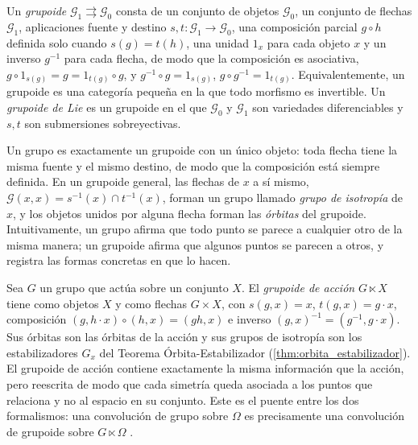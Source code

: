 \begin{definition}[Grupoide]\label{def:grupoide}
Un \textit{grupoide} $\mathcal{G}_1 \rightrightarrows \mathcal{G}_0$ consta de un conjunto de objetos $\mathcal{G}_0$, un conjunto de flechas $\mathcal{G}_1$, aplicaciones fuente y destino $s, t: \mathcal{G}_1 \to \mathcal{G}_0$, una composición parcial $g \circ h$ definida solo cuando $s(g) = t(h)$, una unidad $1_x$ para cada objeto $x$ y un inverso $g^{-1}$ para cada flecha, de modo que la composición es asociativa, $g \circ 1_{s(g)} = g = 1_{t(g)} \circ g$, y $g^{-1} \circ g = 1_{s(g)}$, $g \circ g^{-1} = 1_{t(g)}$. Equivalentemente, un grupoide es una categoría pequeña en la que todo morfismo es invertible. Un \textit{grupoide de Lie} es un grupoide en el que $\mathcal{G}_0$ y $\mathcal{G}_1$ son variedades diferenciables y $s, t$ son submersiones sobreyectivas.
\end{definition}

Un grupo es exactamente un grupoide con un único objeto: toda flecha tiene la misma fuente y el mismo destino, de modo que la composición está siempre definida. En un grupoide general, las flechas de $x$ a sí mismo, $\mathcal{G}(x,x) = s^{-1}(x) \cap t^{-1}(x)$, forman un grupo llamado \textit{grupo de isotropía} de $x$, y los objetos unidos por alguna flecha forman las \textit{órbitas} del grupoide. Intuitivamente, un grupo afirma que todo punto se parece a cualquier otro de la misma manera; un grupoide afirma que algunos puntos se parecen a otros, y registra las formas concretas en que lo hacen.

\begin{example}\label{ex:grupoide_accion}
Sea $G$ un grupo que actúa sobre un conjunto $X$. El \textit{grupoide de acción} $G \ltimes X$ tiene como objetos $X$ y como flechas $G \times X$, con $s(g,x) = x$, $t(g,x) = g \cdot x$, composición $(g, h \cdot x) \circ (h, x) = (gh, x)$ e inverso $(g,x)^{-1} = (g^{-1}, g \cdot x)$. Sus órbitas son las órbitas de la acción y sus grupos de isotropía son los estabilizadores $G_x$ del Teorema Órbita-Estabilizador (\autoref{thm:orbita_estabilizador}). El grupoide de acción contiene exactamente la misma información que la acción, pero reescrita de modo que cada simetría queda asociada a los puntos que relaciona y no al espacio en su conjunto. Este es el puente entre los dos formalismos: una convolución de grupo sobre $\Omega$ es precisamente una convolución de grupoide sobre $G \ltimes \Omega$ \citep{maruyama2025categorical}.
\end{example}

